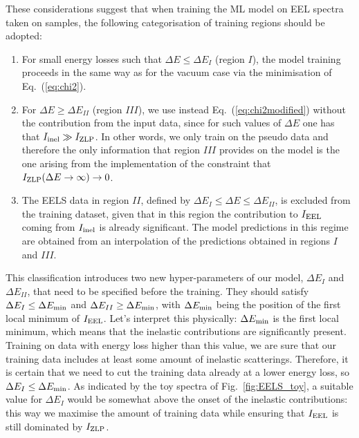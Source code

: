 These considerations suggest that when training the ML model on EEL spectra taken on samples,
the following categorisation of training regions should be adopted:

\begin{enumerate}

\item For small energy losses such that $\Delta E \le \Delta E_I$ (region $I$),
  the model training  proceeds in the same way as for the vacuum case
  via the minimisation of Eq.~(\ref{eq:chi2}).

\item  
  For $\Delta E \ge \Delta E_{II}$ (region $III$), we use instead Eq.~(\ref{eq:chi2modified})
  without the contribution from the input data, since for such values
  of $\Delta E$ one has that $I_{\rm inel}\gg I_{\rm ZLP}$.
  In other words, we only train on the pseudo data and therefore
  the only information that region $III$ provides
  on the model is the one arising from the implementation
  of the constraint that $I_{\rm ZLP}(\Delta E\to \infty)\to 0$.

\item The EELS data in region $II$, defined by $\Delta E_I \le \Delta E \le \Delta E_{II}$,
  is excluded from the training dataset, given that in this region the contribution to $I_{\rm EEL}$
  coming from $I_{\rm inel}$ is already significant.
  The model predictions in this regime are obtained from an interpolation
  of the predictions obtained in regions $I$ and $III$.

\end{enumerate}

This classification introduces two new hyper-parameters of our model, $\Delta E_I$ and
$\Delta E_{II}$, that need to be specified before the training.
%
They should satisfy $\Delta E_I \le \Delta E_{\rm min}$ and $\Delta E_{II} \ge \Delta E_{\rm min}$,
with $\Delta E_{\rm min}$ being the position of the first local minimum of $I_{\rm EEL}$.
%
Let's interpret this physically: $\Delta E_{\rm min}$ is the first local minimum, which means that 
the inelastic contributions are significantly present.
%
Training on data with energy loss higher than this value, we are sure that our training data includes
at least some amount of inelastic scatterings.
%
Therefore, it is certain that we need to cut the training data already at a lower energy loss,
so $\Delta E_I \le \Delta E_{\rm min}$.
%
As indicated by the toy spectra of Fig.~\ref{fig:EELS_toy}, a suitable value for $\Delta E_{I}$
would be somewhat above the onset of the inelastic contributions: this way we maximise
the amount of training data while ensuring that $I_{\rm EEL}$ is still dominated
by $I_{\rm ZLP}$.\\

